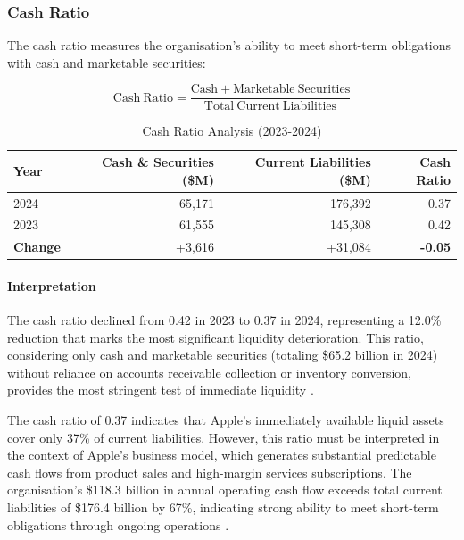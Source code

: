 \documentclass[12pt,a4paper]{article}
\begin{document}
\subsubsection{Cash Ratio}

The cash ratio measures the organisation's ability to meet short-term obligations with cash and marketable securities:

\begin{equation}
\mathrm{Cash\ Ratio} = \frac{\mathrm{Cash} + \mathrm{Marketable\ Securities}}{\mathrm{Total\ Current\ Liabilities}}
\end{equation}

\begin{table}[H]
\centering
\caption{Cash Ratio Analysis (2023-2024)}
\label{tab:cash_ratio}
\begin{tabular}{lrrr}
\toprule
\textbf{Year} & \textbf{Cash \& Securities (\$M)} & \textbf{Current Liabilities (\$M)} & \textbf{Cash Ratio} \\
\midrule
2024 & 65,171 & 176,392 & 0.37 \\
2023 & 61,555 & 145,308 & 0.42 \\
\textbf{Change} & +3,616 & +31,084 & \textbf{-0.05} \\
\bottomrule
\end{tabular}
\end{table}

\paragraph{Interpretation}

The cash ratio declined from 0.42 in 2023 to 0.37 in 2024, representing a 12.0\% reduction that marks the most significant liquidity deterioration. This ratio, considering only cash and marketable securities (totaling \$65.2 billion in 2024) without reliance on accounts receivable collection or inventory conversion, provides the most stringent test of immediate liquidity \citep{apple202410k}.

The cash ratio of 0.37 indicates that Apple's immediately available liquid assets cover only 37\% of current liabilities. However, this ratio must be interpreted in the context of Apple's business model, which generates substantial predictable cash flows from product sales and high-margin services subscriptions. The organisation's \$118.3 billion in annual operating cash flow exceeds total current liabilities of \$176.4 billion by 67\%, indicating strong ability to meet short-term obligations through ongoing operations \citep{kieso2023}.
\end{document}
